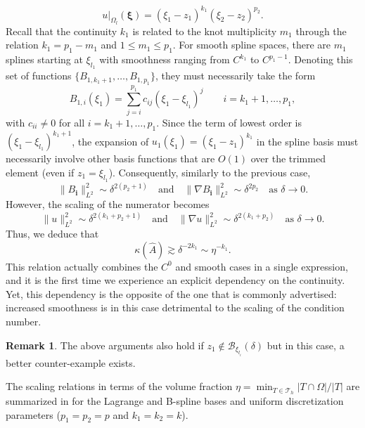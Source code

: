 \documentclass{article}
\numberwithin{equation}{section}
\newcommand{\restr}[2]{\left.{#1}\right|_{#2}}
\theoremstyle{definition}
\newtheorem{remark}[definition]{Remark}
\begin{document}
\begin{itemize}
\begin{equation*}
    \restr{u}{\Omega_l}(\bm{\xi}) = (\xi_1-z_1)^{k_1}(\xi_2-z_2)^{p_2}.
\end{equation*}
Recall that the continuity $k_1$ is related to the knot multiplicity $m_1$ through the relation $k_1=p_1-m_1$ and $1 \leq m_1 \leq p_1$. For smooth spline spaces, there are $m_1$ splines starting at $\xi_{l_1}$ with smoothness ranging from $C^{k_1}$ to $C^{p_1-1}$. Denoting this set of functions $\{B_{1,k_1+1},\dots,B_{1,p_1}\}$, they must necessarily take the form
\begin{equation*}
    B_{1,i}(\xi_1) = \sum_{j=i}^{p_1} c_{ij}(\xi_1-\xi_{l_1})^j \qquad i=k_1+1,\dots,p_1,
\end{equation*}
with $c_{ii} \neq 0$ for all $i=k_1+1,\dots,p_1$. Since the term of lowest order is $(\xi_1-\xi_{l_1})^{k_1+1}$, the expansion of $u_1(\xi_1)=(\xi_1-z_1)^{k_1}$ in the spline basis must necessarily involve other basis functions that are $O(1)$ over the trimmed element (even if $z_1=\xi_{l_1}$). Consequently, similarly to the previous case,
\begin{equation*}
    \|B_{\bm{i}}\|_{L^2}^2 \sim \delta^{2(p_2+1)} \quad \text{and} \quad \|\nabla B_{\bm{i}}\|_{L^2}^2 \sim \delta^{2p_2} \quad \text{as } \delta \to 0.
\end{equation*}
However, the scaling of the numerator becomes
\begin{equation*}
    \|u\|_{L^2}^2 \sim \delta^{2(k_1+p_2+1)} \quad \text{and} \quad \|\nabla u\|_{L^2}^2 \sim \delta^{2(k_1+p_2)} \quad \text{as } \delta \to 0.
\end{equation*}
Thus, we deduce that
\begin{equation*}
    \kappa(\hat{A}) \gtrsim \delta^{-2k_1} \sim \eta^{-k_1}.
\end{equation*}
This relation actually combines the $C^0$ and smooth cases in a single expression, and it is the first time we experience an explicit dependency on the continuity. Yet, this dependency is the opposite of the one that is commonly advertised: increased smoothness is in this case detrimental to the scaling of the condition number.
\end{itemize}

\begin{remark}
The above arguments also hold if $z_1 \notin \mathcal{B}_{\xi_{l_i}}(\delta)$ but in this case, a better counter-example exists.   
\end{remark}

The scaling relations in terms of the volume fraction $\eta = \min_{T \in \mathcal{T}_h} |T \cap \Omega|/|T|$ are summarized in  for the Lagrange and B-spline bases and uniform discretization parameters ($p_1=p_2=p$ and $k_1=k_2=k$).
\end{document}
